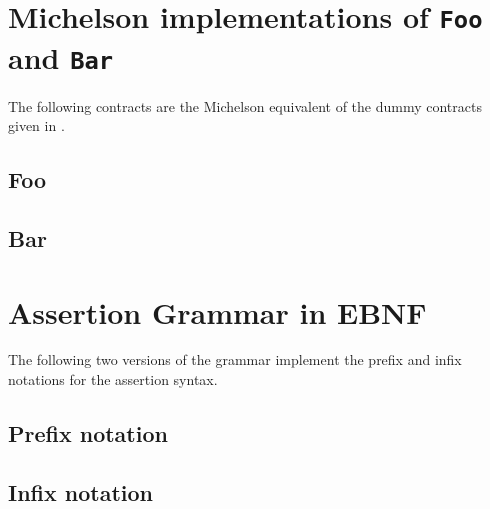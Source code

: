 \appendix
\chapter{Michelson implementations of \texttt{Foo} and \texttt{Bar}}\label{apx:cost_analysis_contract}
The following contracts are the Michelson equivalent of the dummy contracts given in .
\section{Foo}

				 
\section{Bar}


\chapter{Assertion Grammar in EBNF}\label{apx:grammar}
The following two versions of the grammar implement the prefix and infix notations for the assertion syntax. 

\section{Prefix notation}


\section{Infix notation}


